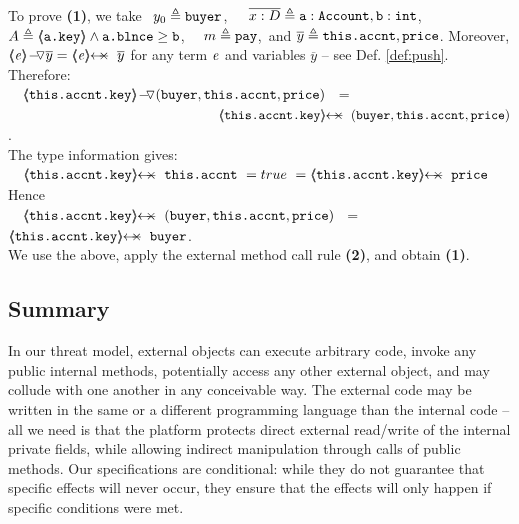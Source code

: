 \vspace{.05cm}
To prove  \textbf{(1)},  we take \  $y_0 \triangleq \mbox{\normalfont{\texttt{buyer}}}$,\ \ \  $\overline {x : D}\triangleq \mbox{\normalfont{\texttt{a}}}:\mbox{\normalfont{\texttt{Account}}},\mbox{\normalfont{\texttt{b}}}:\mbox{\normalfont{\texttt{int}}}$, 
\ \ $A \triangleq  \langle\!\!\langle \mbox{\normalfont{\texttt{a.key}}} \rangle\!\!\rangle\wedge \mbox{\normalfont{\texttt{a.\mbox{\normalfont{\texttt{blnce}}}}}}\geq \mbox{\normalfont{\texttt{b}}}$, \ \ 
$m \triangleq \mbox{\normalfont{\texttt{pay}}}$,\ and $\overline {y} \triangleq \mbox{\normalfont{\texttt{this.accnt}}},\mbox{\normalfont{\texttt{price}}}$. 
 Moreover, $\PushAS y {\inside \re} = \protectedFrom \re {\overline{y}}$ for any term $\mathit{e}$ and variables $\overline y$ 
-- see  Def. \ref{def:push}.
Therefore:\\
   {\small{$\strut \ \ \ \PushASLong {(\prg{buyer},\prg{this.\myAccount},\prg{price})}  {\inside {\prg{this.\myAccount.key}}}$}} \ = \\
 {\small{$\strut \ \hspace{5.5cm}  \protectedFrom {\prg{this.\myAccount.key}} {(\prg{buyer},\prg{this.\myAccount},\prg{price})}$}}.\\
 The type information gives:\\
  {\small{$\strut \ \ \ \protectedFrom {\prg{this.\myAccount.key}} {\prg{this.\myAccount}}\ = true \ =  \protectedFrom {\prg{this.\myAccount.key}} {\prg{price}}$}}\\
  Hence\\
  {\small{$\strut \ \ \ \protectedFrom {\prg{this.\myAccount.key}} {(\prg{buyer},\prg{this.\myAccount},\prg{price})}$ 
 \ = \  $\protectedFrom {\prg{this.\myAccount.key}} {\prg{buyer}}$.}} \\
We use the above,  apply the external method call rule \textbf{(2)},  and obtain \textbf{(1)}.
 

 
\subsection*{Summary}

In our threat model, external objects can execute arbitrary code, invoke any public internal methods,  potentially access any other external object, and may collude with one another in any conceivable way.
The external code may be written in the same or a different programming language than the internal code -- all we need is that the platform protects direct external read/write of  the internal private fields, while allowing indirect manipulation through calls of public methods.
Our specifications are conditional: while they do not guarantee that specific effects will never occur, they  ensure that the effects will only happen if specific conditions were met. %



